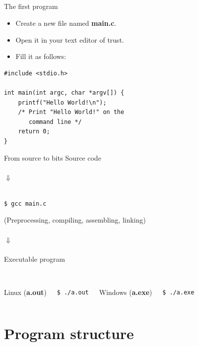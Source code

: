 \subsection{}
\begin{frame}[fragile]{The first program}
	\begin{itemize}
		\item Create a new file named \textbf{main.c}.
		\item Open it in your text editor of trust.
		\item Fill it as follows:
	\end{itemize}
	\begin{lstlisting}
#include <stdio.h>

int main(int argc, char *argv[]) {
	printf("Hello World!\n");
	/* Print "Hello World!" on the
	   command line */
	return 0;
}
\end{lstlisting}
\end{frame}
\begin{frame}[fragile]{From source to bits}
	\centering
	Source code\\\ \\
	$\Downarrow$\\\ \\
	\begin{lstlisting}[numbers=none]
$ gcc main.c
\end{lstlisting}
(Preprocessing, compiling, assembling, linking)
	\ \\\ \\
	$\Downarrow$\\\ \\
	Executable program\\\ \\
	\begin{columns}[T]
		Linux (\textbf{a.out})
		\begin{lstlisting}[numbers=none]
$ ./a.out
\end{lstlisting}
		Windows (\textbf{a.exe})
		\begin{lstlisting}[numbers=none]
$ ./a.exe
\end{lstlisting}
	\end{columns}
\end{frame}
\section{Program structure}
